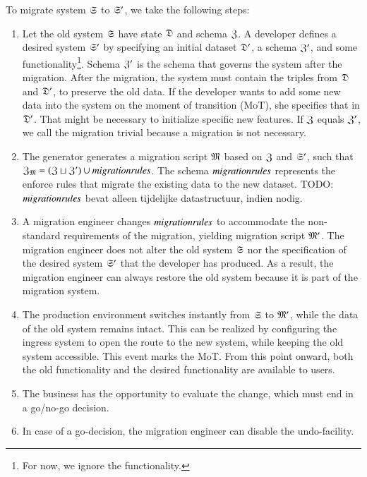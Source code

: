\documentclass{elsarticle}
\begin{document}
   To migrate system $\mathfrak{S}$ to $\mathfrak{S}'$, we take the following steps:
\begin{enumerate}
   \item Let the old system $\mathfrak{S}$ have state $\mathfrak{D}$ and schema $\mathfrak{Z}$.
         A developer defines a desired system $\mathfrak{S}'$ by specifying an initial dataset $\mathfrak{D}'$, a schema $\mathfrak{Z}'$, and some functionality\footnote{For now, we ignore the functionality.}.
         Schema $\mathfrak{Z}'$ is the schema that governs the system after the migration.
         After the migration, the system must contain the triples from $\mathfrak{D}$ and $\mathfrak{D}'$, to preserve the old data.
         If the developer wants to add some new data into the system on the moment of transition (MoT),
         she specifies that in $\mathfrak{D}'$.
         That might be necessary to initialize specific new features.
         If $\mathfrak{Z}$ equals $\mathfrak{Z}'$, we call the migration trivial because a migration is not necessary.
   \item The generator generates a migration script $\mathfrak{M}$ based on $\mathfrak{Z}$ and $\mathfrak{S}'$,
         such that $\mathfrak{Z}_{\mathfrak{M}}=(\mathfrak{Z}\sqcup\mathfrak{Z}')\cup\text{\it migrationrules\/}$.
         The schema $\text{\it migrationrules\/}$ represents the enforce rules that migrate the existing data to the new dataset.
         TODO: $\text{\it migrationrules\/}$ bevat alleen tijdelijke datastructuur, indien nodig.
   \item A migration engineer changes $\text{\it migrationrules\/}$ to accommodate the non-standard requirements of the migration,
         yielding migration script $\mathfrak{M}'$.
         The migration engineer does not alter the old system $\mathfrak{S}$ nor the specification of the desired system $\mathfrak{S}'$ that the developer has produced.
         As a result, the migration engineer can always restore the old system because it is part of the migration system.
   \item The production environment switches instantly from $\mathfrak{S}$ to $\mathfrak{M}'$,
         while the data of the old system remains intact.
         This can be realized by configuring the ingress system to open the route to the new system,
         while keeping the old system accessible.
         This event marks the MoT.
         From this point onward, both the old functionality and the desired functionality are available to users.
   \item The business has the opportunity to evaluate the change, which must end in a go/no-go decision.
   \item In case of a go-decision, the migration engineer can disable the undo-facility.

\end{enumerate}
\end{document}
